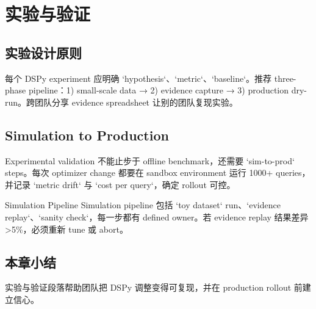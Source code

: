 \section{实验与验证}

\subsection{实验设计原则}

每个 DSPy experiment 应明确 `hypothesis`、`metric`、`baseline`。推荐 three-phase pipeline：1) small-scale data → 2) evidence capture → 3) production dry-run。跨团队分享 evidence spreadsheet 让别的团队复现实验。

\subsection{Simulation to Production}

Experimental validation 不能止步于 offline benchmark，还需要 `sim-to-prod` steps。每次 optimizer change 都要在 sandbox environment 运行 1000+ queries，并记录 `metric drift` 与 `cost per query`，确定 rollout 可控。

\begin{knowledgebox}{Simulation Pipeline}
Simulation pipeline 包括 `toy dataset` run、`evidence replay`、`sanity check`，每一步都有 defined owner。若 evidence replay 结果差异 >5\%，必须重新 tune 或 abort。
\end{knowledgebox}

\subsection{本章小结}

实验与验证段落帮助团队把 DSPy 调整变得可复现，并在 production rollout 前建立信心。

